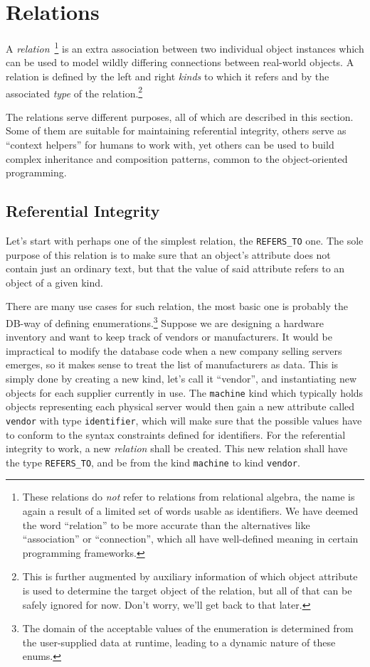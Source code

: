 \documentclass[deska]{subfiles}
\begin{document}
\section{Relations}
\label{sec:objects-and-relations-relations}

A {\em relation}~\footnote{These relations do {\em not} refer to relations from relational algebra, the name is again a
result of a limited set of words usable as identifiers.  We have deemed the word ``relation'' to be more accurate than
the alternatives like ``association'' or ``connection'', which all have well-defined meaning in certain programming
frameworks.} is an extra association between two individual object instances which can be used to model wildly differing
connections between real-world objects.  A relation is defined by the left and right {\em kinds} to which it refers and
by the associated {\em type} of the relation.\footnote{This is further augmented by auxiliary information of which
object attribute is used to determine the target object of the relation, but all of that can be safely ignored for now.
Don't worry, we'll get back to that later.}

The relations serve different purposes, all of which are described in this section.  Some of them are suitable for
maintaining referential integrity, others serve as ``context helpers'' for humans to work with, yet others can be used
to build complex inheritance and composition patterns, common to the object-oriented programming.

\subsection{Referential Integrity}
\label{sec:relation-refers-to}

Let's start with perhaps one of the simplest relation, the {\tt REFERS\_TO} one.  The sole purpose of this relation is
to make sure that an object's attribute does not contain just an ordinary text, but that the value of said attribute
refers to an object of a given kind.

There are many use cases for such relation, the most basic one is probably the DB-way of defining
enumerations.\footnote{The domain of the acceptable values of the enumeration is determined from the user-supplied data
at runtime, leading to a dynamic nature of these enums.} Suppose
we are designing a hardware inventory and want to keep track of vendors or manufacturers.  It would be impractical to
modify the database code when a new company selling servers emerges, so it makes sense to treat the list of
manufacturers as data.  This is simply done by creating a new kind, let's call it ``vendor'', and instantiating new
objects for each supplier currently in use.  The {\tt machine} kind which typically holds objects representing each
physical server would then gain a new attribute called {\tt vendor} with type {\tt identifier}, which will make sure
that the possible values have to conform to the syntax constraints defined for identifiers.  For the referential
integrity to work, a new {\em relation} shall be created.  This new relation shall have the type {\tt REFERS\_TO}, and
be from the kind {\tt machine} to kind {\tt vendor}.
\end{document}

